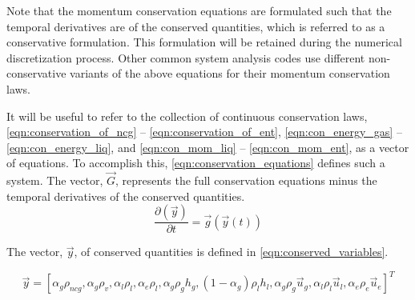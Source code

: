 Note that the momentum conservation equations are formulated such that the temporal derivatives are of the conserved quantities, which is referred to as a conservative formulation.
This formulation will be retained during the numerical discretization process.
Other common system analysis codes \cite{TRACE, RELAP} use different non-conservative variants of the above equations for their momentum conservation laws.

It will be useful to refer to the collection of continuous conservation laws, \eqref{eqn:conservation_of_ncg} -- \eqref{eqn:conservation_of_ent}, \eqref{eqn:con_energy_gas} -- \eqref{eqn:con_energy_liq}, and \eqref{eqn:con_mom_liq} -- \eqref{eqn:con_mom_ent}, as a vector of equations.
To accomplish this, \eqref{eqn:conservation_equations} defines such a system.
The vector, $\vec{G}$, represents the full conservation equations minus the temporal derivatives of the conserved quantities.
\begin{equation}
\label{eqn:conservation_equations}
\frac{\partial \left( \vec{y} \right)}{\partial t} = \vec{g}(\vec{y}(t))
\end{equation}

The vector, $\vec{y}$, of conserved quantities is defined in \eqref{eqn:conserved_variables}.

\begin{equation}
\label{eqn:conserved_variables}
\vec{y} = [\alpha_g \rho_{ncg}, \alpha_g \rho_v, \alpha_l \rho_l, \alpha_e \rho_l, \alpha_g \rho_g h_g, (1 - \alpha_g) \rho_l h_l, \alpha_g \rho_g \vec{u}_g, \alpha_l \rho_l \vec{u}_l, \alpha_e \rho_e \vec{u}_e]^{T}
\end{equation}

